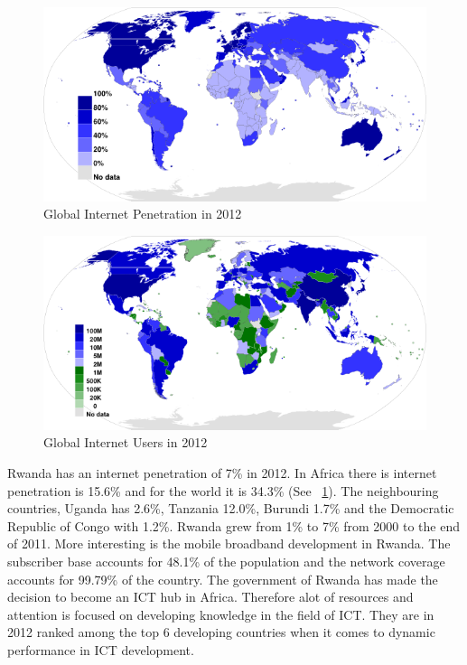 \begin{figure}
\centering
\includegraphics[width=12cm]{empirical/images/internet_penetration_2012}
\caption{Global Internet Penetration in 2012 \cite{3}}
\label{fig:global_internet_penetration_2012}
\end{figure}

\begin{figure}
\centering
\includegraphics[width=12cm]{empirical/images/internet_users_2012}
\caption{Global Internet Users in 2012 \cite{3}}
\label{fig:global_internet_users_2012}
\end{figure}

Rwanda has an internet penetration of 7\% in 2012. In Africa there is internet penetration is 15.6\% and for the world it is 34.3\% (See ~\ref{fig:global_internet_penetration_2012}).
The neighbouring countries, Uganda has 2.6\%, Tanzania 12.0\%, Burundi 1.7\% and the Democratic Republic of Congo with 1.2\%\cite{4}. Rwanda grew from 1\% to 7\% from 2000 to the end of 2011\cite{2}.
More interesting is the mobile broadband development in Rwanda. The subscriber base accounts for 48.1\% of the population and the network coverage accounts for 99.79\% of the country.
The government of Rwanda has made the decision to become an ICT hub in Africa. Therefore alot of resources and attention is focused on developing knowledge in the field of ICT. 
They are in 2012 ranked among the top 6 developing countries when it comes to dynamic performance in ICT development\cite{5}.

